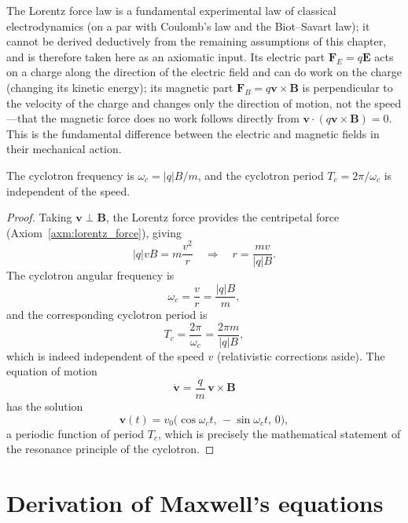 \begin{remark}
The Lorentz force law is a fundamental experimental law of classical electrodynamics (on a par with Coulomb's law and the Biot--Savart law); it cannot be derived deductively from the remaining assumptions of this chapter, and is therefore taken here as an axiomatic input. Its electric part $\mathbf{F}_E = q\mathbf{E}$ acts on a charge along the direction of the electric field and can do work on the charge (changing its kinetic energy); its magnetic part $\mathbf{F}_B = q\mathbf{v}\times\mathbf{B}$ is perpendicular to the velocity of the charge and changes only the direction of motion, not the speed---that the magnetic force does no work follows directly from $\mathbf{v}\cdot(q\mathbf{v}\times\mathbf{B}) = 0$. This is the fundamental difference between the electric and magnetic fields in their mechanical action.
\end{remark}

\begin{proposition}\label{prop:cyclotron_motion}
The cyclotron frequency is $\omega_c = |q|B/m$, and the cyclotron period $T_c = 2\pi/\omega_c$ is independent of the speed.
\end{proposition}

\begin{proof}
Taking $\mathbf{v}\perp\mathbf{B}$, the Lorentz force provides the centripetal force (Axiom~\ref{axm:lorentz_force}), giving
\[
|q|vB = m\frac{v^2}{r}
\quad\Longrightarrow\quad
r = \frac{mv}{|q|B}.
\]
The cyclotron angular frequency is
\[
\omega_c = \frac{v}{r} = \frac{|q|B}{m},
\]
and the corresponding cyclotron period is
\[
T_c = \frac{2\pi}{\omega_c} = \frac{2\pi m}{|q|B},
\]
which is indeed independent of the speed $v$ (relativistic corrections aside).
The equation of motion
\[
\dot{\mathbf{v}} = \frac{q}{m}\,\mathbf{v}\times\mathbf{B}
\]
has the solution
\[
\mathbf{v}(t)
= v_0\bigl(\cos\omega_c t,\, -\sin\omega_c t,\, 0\bigr),
\]
a periodic function of period $T_c$, which is precisely the mathematical statement of the resonance principle of the cyclotron.
\end{proof}

\section{Derivation of Maxwell's equations}


